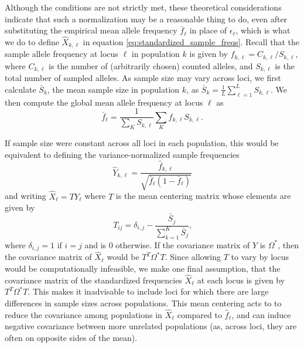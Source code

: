 \documentclass[10pt,letterpaper]{article}
\begin{document}
Although the conditions are not strictly met, 
these theoretical considerations indicate that such a normalization may be a reasonable thing to do,
even after substituting the empirical mean allele frequency $\bar f_\ell$ in place of $\epsilon_\ell$,
which is what we do to define $\hat X_{k,\ell}$ in equation \eqref{eq:standardized_sample_freqs}.
Recall that the sample allele frequency at locus $\ell$ in population $k$ is given by $\hat{f}_{k,\ell} = C_{k,\ell}/S_{k,\ell}$,  
where $C_{k,\ell}$ is the number of (arbitrarily chosen) counted alleles,
and $S_{k,\ell}$ is the total number of sampled alleles.
As sample size may vary across loci, we first calculate $\bar{S}_k$, 
the mean sample size in population $k$, 
as $\bar{S}_k = \frac{1}{L}\sum_{\ell=1}^L S_{k,\ell}$.  
We then compute the global mean allele frequency at locus $\ell$ as
\begin{equation}
\label{eq:sample_mean_freq}
\bar{f}_{\ell} = \frac{1}{\sum_K S_{k,\ell}} \sum_K \hat{f}_{k,\ell} S_{k,\ell} .
\end{equation}

If sample size were constant across all loci in each population, this would be equivalent to defining the variance-normalized sample frequencies
\begin{equation}
\hat{Y}_{k,\ell} = \frac{ \hat{f}_{k,\ell} } {\sqrt{\bar{f}_{\ell}(1-\bar{f}_{\ell})}}
\end{equation}
and writing $\hat{X}_{\ell} = T Y_{\ell} $ where $T$ is the mean centering matrix whose elements are given by
\begin{equation}
T_{ij} = \delta_{i,j}  -  \frac{\bar{S}_j}{\sum\limits_{k=1}^{K} \bar{S}_j	} \text{,}
\end{equation}
where $\delta_{i,j}=1$ if $i=j$ and is 0 otherwise.
If the covariance matrix of $Y$ is $\Omega^*$,
then the covariance matrix of $\hat X_\ell$ would be $T^T \Omega^* T$.
Since allowing $T$ to vary by locus would be computationally infeasible,
we make one final assumption,
that the covariance matrix of the standardized frequencies $\hat X_\ell$ at each locus is given by $T^T \Omega^* T$.
This makes it inadvisable to include loci for which there are large differences in sample sizes across populations.
This mean centering acts to to reduce the covariance among populations in $\hat{X}_{\ell}$ compared to $\hat{f}_{\ell}$, and can induce negative covariance between more unrelated populations (as, across loci, they are often on opposite sides of the mean). 
\end{document}
